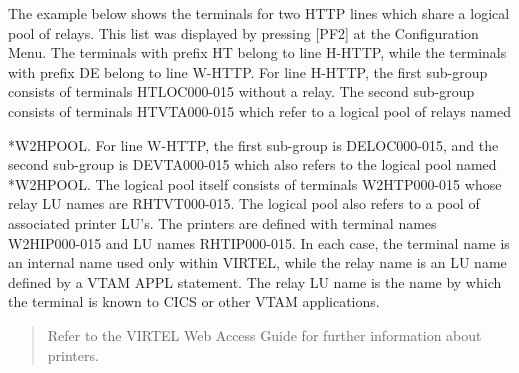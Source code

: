 \documentclass[letterpaper,10pt,english]{sphinxmanual}
\begin{document}
The example below shows the terminals for two HTTP lines which share a logical pool of relays. This list was displayed by pressing {[}PF2{]} at the Configuration Menu. The terminals with prefix HT belong to line H-HTTP, while the terminals with prefix DE belong to line W-HTTP. For line H-HTTP, the first sub-group consists of terminals HTLOC000-015 without a relay. The second sub-group consists of terminals HTVTA000-015 which refer to a logical pool of relays named

*W2HPOOL. For line W-HTTP, the first sub-group is DELOC000-015, and the second sub-group is DEVTA000-015 which also refers to the logical pool named *W2HPOOL. The logical pool itself consists of terminals W2HTP000-015 whose relay LU names are RHTVT000-015. The logical pool also refers to a pool of associated printer LU’s. The printers are defined with
terminal names W2HIP000-015 and LU names RHTIP000-015. In each case, the terminal name is an internal name used only within VIRTEL, while the relay name is an LU name defined by a VTAM APPL statement. The relay LU name is the name by which the terminal is known to CICS or other VTAM applications.





\begin{quote}

Refer to the VIRTEL Web Access Guide for further information about printers.
\end{quote}
\end{document}
